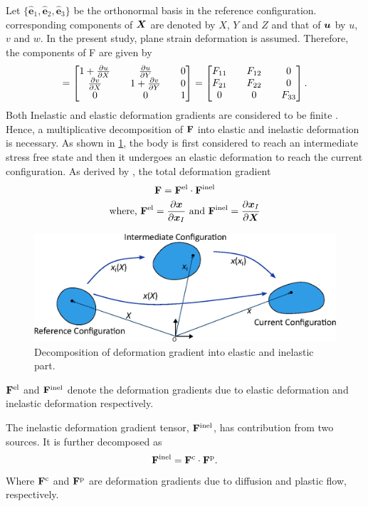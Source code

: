 Let $\{\hat{\bm{e}}_1, \hat{\bm{e}}_2, \hat{\bm{e}}_3\}$ be the orthonormal basis in the reference configuration. corresponding components of ${\bm{X}}$ are denoted by $X$, $Y$ and $Z$ and that of ${\bm{u}}$ by $u$, $v$ and $w$. In the present study, plane strain deformation is assumed. Therefore, the components of F are given by \citep{2009ContMechLai} 
\begin{align}
[\F] = 
\begin{bmatrix}
       1 + \pdiff{u}{X} && \pdiff{u}{Y} && 0 \\
       \pdiff{v}{X} && 1 + \pdiff{v}{Y} && 0 \\
       0 && 0 && 1
\end{bmatrix} = \tensor{F}. \label{eq:F_tensor}
\end{align}
Both Inelastic and elastic deformation gradients are considered to be finite \citep{2011JMPSBower}. Hence, a multiplicative decomposition of $\mathbf{F}$ into elastic and inelastic deformation is necessary. As shown in \ref{fig:decomposition}, the body is first considered to reach an intermediate stress free state and then it undergoes an elastic deformation to reach the current configuration. As derived by \citet{1969Lee}, the total deformation gradient   
\begin{gather}
\mathbf{F} = \mathbf{F}^{{\rm{el}}} \cdot  \mathbf{F}^{{\rm{inel}}} \label{eq:F_decomposition} \\
\text{where, } \mathbf{F}^{{\rm{el}}} = \frac{\partial {\bm{x}}}{\partial {\bm{x}}_I} \text{ and } \mathbf{F}^{{\rm{inel}}} = \frac{\partial {\bm{x}}_{I}}{\partial {\bm{X}}} \nonumber
\end{gather}
\begin{figure}[H]
    \centering
    \includegraphics[width=\textwidth]{figures/decomposition.eps}
    \caption{Decomposition of deformation gradient into elastic and inelastic part.}
    \label{fig:decomposition}
\end{figure}
$\mathbf{F}^{{\rm{el}}}$ and $\mathbf{F}^{{\rm{inel}}}$ denote the deformation gradients due to elastic deformation and inelastic deformation respectively.

The inelastic deformation gradient tensor, $\mathbf{F}^{{\rm{inel}}}$, has contribution from two sources. It is further decomposed as 
\begin{gather}
    \mathbf{F}^{\rm{inel}} = \mathbf{F}^{\rm{c}} \cdot \mathbf{F}^{\rm{p}}. \label{eq:Finel_decomposition}
\end{gather}
Where $\mathbf{F}^{\rm{c}}$ and $\mathbf{F}^{\rm{p}}$ are deformation gradients due to diffusion and plastic flow, respectively.


